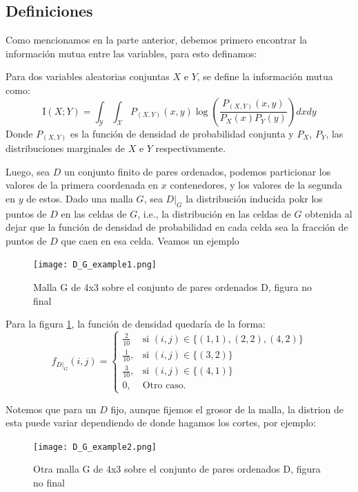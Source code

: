 \subsection{Definiciones}

	Como mencionamos en la parte anterior, debemos primero encontrar la informaci\'on mutua entre las variables, para esto definamos:

	\begin{defn}
		Para dos variables aleatorias conjuntas $X$ e $Y$, se define la informaci\'on mutua como:
		$$
		\mathrm{I}(X ; Y)=\int_{\mathcal{Y}} \int_{\mathcal{X}} P_{(X, Y)}(x, y) \log \left(\frac{P_{(X, Y)}(x, y)}{P_{X}(x) P_{Y}(y)}\right)dxdy
		$$
		Donde $P_{(X, Y)}$ es la funci\'on de densidad de probabilidad conjunta y $P_{X}$, $P_{Y}$, las distribuciones marginales de $X$ e $Y$ respectivamente. 
	\end{defn}

	Luego, sea $D$ un conjunto finito de pares ordenados, podemos particionar los valores de la primera coordenada en $x$ contenedores, y los valores de la segunda en $y$ de estos. Dado una malla $G$, sea $D|_G$ la distribuci\'on inducida pokr los puntos de $D$ en las celdas de $G$, i.e., la distribuci\'on en las celdas de $G$ obtenida al dejar que la funci\'on de densidad de probabilidad en cada celda sea la fracci\'on de puntos de $D$ que caen en esa celda. Veamos un ejemplo
	\begin{figure}[H]\label{malla_G}
		\centering
		\texttt{[image: D\_G\_example1.png]}
		\caption{Malla G de 4x3 sobre el conjunto de pares ordenados D, figura no final}
	\end{figure}

	Para la figura \ref{malla_G}, la funci\'on de densidad quedar\'ia de la forma:
	\[
		f_{D|_G}(i,j) = \left\{\begin{array}{lr}
			\frac{2}{10} & \text{si } (i,j) \in \{ (1,1), (2,2), (4,2)\} \\
			\frac{1}{10}, & \text{si }(i,j) \in \{ (3,2)\}  \\
			\frac{3}{10}, & \text{si }(i,j) \in \{ (4,1)\}  \\
			0, & \text{Otro caso.}
			\end{array}\right.
	\]



	Notemos que para un $D$ fijo, aunque fijemos el grosor de la malla, la distrion de esta puede variar dependiendo de donde hagamos los cortes, por ejemplo:

	\begin{figure}[H] \label{malla_G_2}
		\centering
		\texttt{[image: D\_G\_example2.png]}
		\caption{Otra malla G de 4x3 sobre el conjunto de pares ordenados D, figura no final}
	\end{figure}

